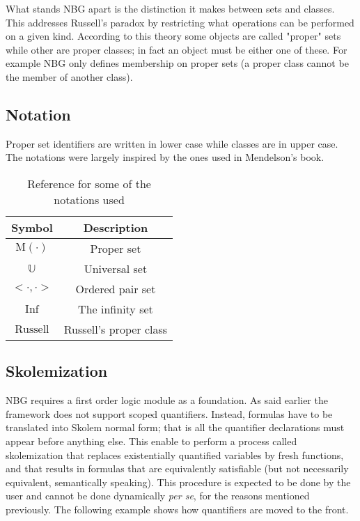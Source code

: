 \documentclass[acmlarge]{acmart}
\begin{document}
What stands NBG apart is the distinction it makes between sets and classes. This addresses Russell's paradox by restricting what operations can be performed on a given kind. According to this theory some objects are called "proper" sets while other are proper classes; in fact an object must be either one of these. For example NBG only defines membership on proper sets (a proper class cannot be the member of another class).

\subsection{Notation}

Proper set identifiers are written in lower case while classes are in upper case. The notations were largely inspired by the ones used in Mendelson's book.

\begin{table}[h!]
\centering
\begin{tabular}{|| c | c ||}
 \hline
 Symbol & Description \\ [0.5ex]
 \hline\hline
 $\text{M}(\cdot)$ & Proper set \\
 $\mathbb{U}$ & Universal set \\
 $<\cdot, \cdot>$ & Ordered pair set \\
 $\text{Inf}$ & The infinity set \\
 $\text{Russell}$ & Russell's proper class \\
 \hline
\end{tabular}
\caption{Reference for some of the notations used}
\label{table:1}
\end{table}

\subsection{Skolemization}

NBG requires a first order logic module as a foundation. As said earlier the framework does not support scoped quantifiers. Instead, formulas have to be translated into Skolem normal form; that is all the quantifier declarations must appear before anything else. This enable to perform a process called skolemization that replaces existentially quantified variables by fresh functions, and that results in formulas that are equivalently satisfiable (but not necessarily equivalent, semantically speaking). This procedure is expected to be done by the user and cannot be done dynamically \emph{per se}, for the reasons mentioned previously. The following example shows how quantifiers are moved to the front.
\end{document}
